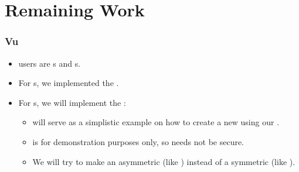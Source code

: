 \section{Remaining Work}


\begin{frame}
\frametitle{Vu}
\begin{itemize}
\item \cry{} users are \eu s and \cg s.
\item For \eu s, we implemented the \rsa{} \cs.
\item For \cg s, we will implement the \dummy{} \cs:
  \begin{itemize}
  \item \dummy{} will serve as a simplistic example
    on how to create a new \cs{} using our \cry{} \cf.
  \item \dummy{} is for demonstration purposes only,
    so \dummy{} needs not be secure.
  \item We will try to make \dummy{} an asymmetric \cs{}
    (like \rsa) instead of a symmetric \cs{} (like \aes).
  \end{itemize}
\end{itemize}
\end{frame}
